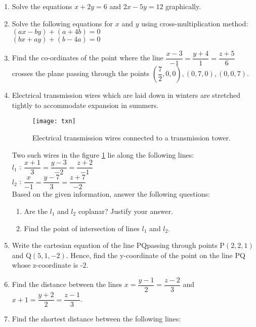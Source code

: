 %
\begin{enumerate}
\item Solve the equations $x+2y=6$ and $2x-5y=12$ graphically.	
\item Solve the following equations for $x$ and $y$ using cross-multiplication method:\\
	\indent\indent\indent$(ax-by)+(a+4b)=0$\\\indent\indent$(bx+ay)+(b-4a)=0$
\item Find the co-ordinates of the point where the line $\dfrac{x-3}{-1}=\dfrac{y+4}{1}=\dfrac{z+5}{6}$ crosses the plane passing through the points $\left(\dfrac{7}{2},0,0\right),(0,7,0),(0,0,7)$.
\item Electrical transmission wires which are laid down in winters are stretched tightly to accommodate expansion in summers.
	\begin{figure}[H]
		\renewcommand{\thefigure}{\arabic{chapter}.\arabic{section}.\arabic{figure}}
		\centering
		\texttt{[image: txn]}\\
		\caption{Electrical transmission wires connected to a transmission tower.}
		\label{fig:txn1}
	\end{figure}
		Two such wires in the figure \ref{fig:txn1} lie along the following lines:\\
			 $l_1$ : $\dfrac{x+1}{3}=\dfrac{y-3}{-2}=\dfrac{z+2}{-1}$\\
	                 $l_2$ : $\dfrac{x}{-1}=\dfrac{y-7}{3}=\dfrac{z+7}{-2}$\\
	Based on the given information, answer the following questions:	\begin{enumerate}
		\item	Are the $l_1$ and $l_2$ coplanar? Justify your answer.
				\item    Find the point of intersection of lines $l_1$ and $l_2$.
			\end{enumerate}
     \item Write the cartesian equation of the line PQ\@ passing through points P$(2,2,1)$ and Q$(5,1,-2)$. Hence, find the y-coordinate of the point on the line PQ whose z-coordinate is -2.
			\item Find the distance between the lines $x=\dfrac{y-1}{2}=\dfrac{z-2}{3}$ and $x+1=\dfrac{y+2}{2}=\dfrac{z-1}{3}$.
\item Find the shortest distance between the following lines:\\

\end{enumerate}
